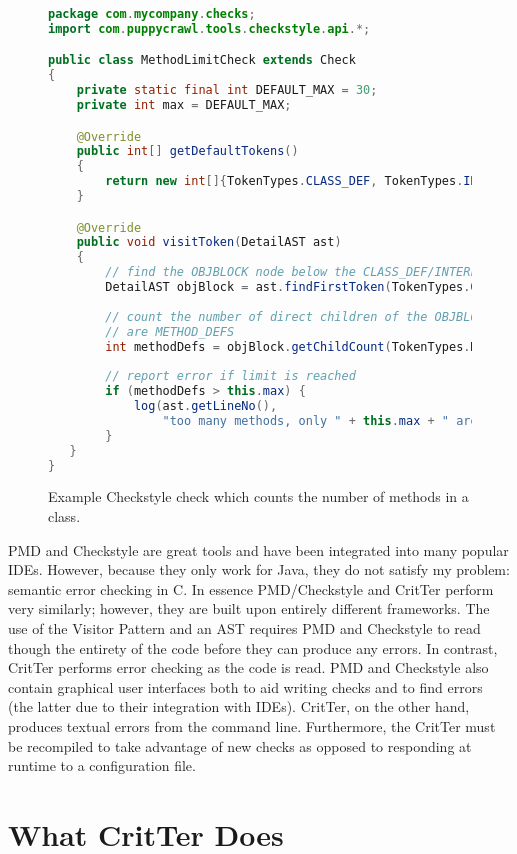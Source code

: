 \documentclass[12pt]{report}
\newcommand{\programName}{CritTer\xspace}
\begin{document}
\begin{figure}
\begin{lstlisting}[language=Java]
package com.mycompany.checks;
import com.puppycrawl.tools.checkstyle.api.*;

public class MethodLimitCheck extends Check
{
    private static final int DEFAULT_MAX = 30;
    private int max = DEFAULT_MAX;

    @Override
    public int[] getDefaultTokens()
    {
        return new int[]{TokenTypes.CLASS_DEF, TokenTypes.INTERFACE_DEF};
    }

    @Override
    public void visitToken(DetailAST ast)
    {
        // find the OBJBLOCK node below the CLASS_DEF/INTERFACE_DEF
        DetailAST objBlock = ast.findFirstToken(TokenTypes.OBJBLOCK);
        
        // count the number of direct children of the OBJBLOCK that 
        // are METHOD_DEFS
        int methodDefs = objBlock.getChildCount(TokenTypes.METHOD_DEF);
        
        // report error if limit is reached
        if (methodDefs > this.max) {
            log(ast.getLineNo(),
                "too many methods, only " + this.max + " are allowed");
        }
   }
}
\end{lstlisting}
\caption[Example Checkstyle Check]{Example Checkstyle check which counts the number of methods in a class.}
\label{checkstyle-rule}
\end{figure}

PMD and Checkstyle are great tools and have been integrated into many popular IDEs. However, 
because they only work for Java, they do not satisfy my problem: semantic error checking in C. In 
essence PMD\slash Checkstyle and \programName perform very similarly; however, they are built upon 
entirely different frameworks. The use of the Visitor Pattern and an AST requires PMD and Checkstyle to 
read though the entirety of the code before they can produce any errors. In contrast, \programName 
performs error checking as the code is read. PMD and Checkstyle also contain graphical user interfaces 
both to aid writing checks and to find errors (the latter due to their integration with IDEs). \programName, 
on the other hand, produces textual errors from the command line. Furthermore, the \programName must 
be recompiled to take advantage of new checks as opposed to responding at runtime to a configuration 
file.

\chapter{What \programName Does}
\end{document}
